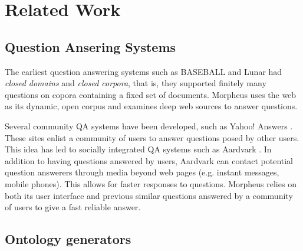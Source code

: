 \section{Related Work}
\label{sec:relatedwork}

\subsection{Question Ansering Systems} 

The earliest question answering systems such as BASEBALL \cite{Green1961} and Lunar \cite{woods1973} had \emph{closed domains} and \emph{closed corpora}, that is, they supported finitely many questions on copora containing a fixed set of documents.
Morpheus uses the web as its dynamic, open corpus and examines deep web sources 
to answer questions.

Several community QA systems have been developed, such as Yahoo! Answers \cite{yahooanswers2008}. These sites enlist a community of users to answer questions posed by other users.  This idea has led to socially integrated QA systems such as Aardvark \cite{vark2010}. In addition to having questions answered by users, Aardvark can contact potential question answerers through media beyond web pages (e.g. instant messages, mobile phones).  This allows for faster responses to questions.  Morpheus relies on both its user interface and previous similar questions answered by a community of users to give a fast reliable answer.


\subsection{Ontology generators} 
\label{sec:ontology_generators}




